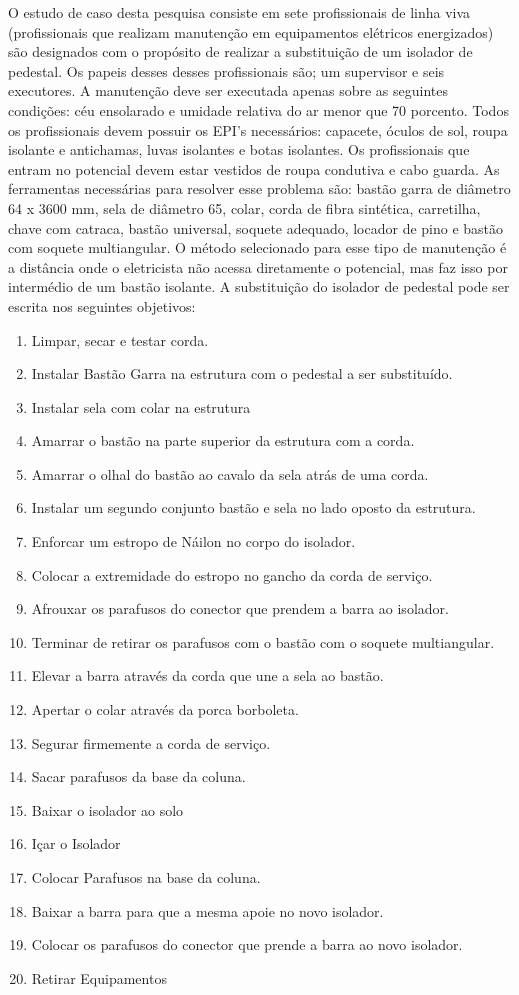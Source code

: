 O estudo de caso desta pesquisa consiste em sete profissionais de linha viva (profissionais que realizam manutenção em equipamentos elétricos energizados) são designados com o propósito de realizar a substituição de um isolador de pedestal. Os papeis desses desses profissionais são; um supervisor e seis executores. A manutenção deve ser executada apenas sobre as seguintes condições: céu ensolarado e umidade relativa do ar menor que 70 porcento. Todos os profissionais devem possuir os EPI's necessários: capacete, óculos de sol, roupa isolante e antichamas, luvas isolantes e botas isolantes. Os profissionais que entram no potencial devem estar vestidos de roupa condutiva e cabo guarda. As ferramentas necessárias para resolver esse problema são: bastão garra de diâmetro 64 x 3600 mm, sela de diâmetro 65, colar, corda de fibra sintética, carretilha, chave com catraca, bastão universal, soquete adequado, locador de pino e bastão com soquete multiangular. O método selecionado para esse tipo de manutenção é a distância onde o eletricista não acessa diretamente o potencial, mas faz isso por intermédio de um bastão isolante. A substituição do isolador 
de pedestal pode ser escrita nos seguintes objetivos: 

\begin{enumerate}
	\item Limpar, secar e testar corda.
	\item Instalar Bastão Garra na estrutura com o pedestal a ser substituído.
	\item Instalar sela com colar na estrutura
	\item Amarrar o bastão na parte superior da estrutura com a corda.
	\item Amarrar o olhal do bastão ao cavalo da sela atrás de uma corda.
	\item Instalar um segundo conjunto bastão e sela no lado oposto da estrutura.
	\item Enforcar um estropo de Náilon no corpo do isolador.
	\item Colocar a extremidade do estropo no gancho da corda de serviço.
	\item Afrouxar os parafusos do conector que prendem a barra ao isolador.
	\item Terminar de retirar os parafusos com o bastão com o soquete multiangular.
	\item Elevar a barra através da corda que une a sela ao bastão.
	\item Apertar o colar através da porca borboleta.
	\item Segurar firmemente a corda de serviço.
	\item Sacar parafusos da base da coluna.
	\item Baixar o isolador ao solo
	\item Içar o Isolador
	\item Colocar Parafusos na base da coluna.
	\item Baixar a barra para que a mesma apoie no novo isolador.
	\item Colocar os parafusos do conector que prende a barra ao novo isolador. 
	\item Retirar Equipamentos
\end{enumerate}

